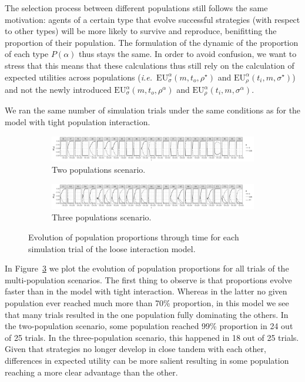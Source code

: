 \documentclass[a4paper]{article}
\begin{document}
The selection process between different populations still follows the same motivation: agents of a certain type that evolve successful strategies (with respect to other types) will be more likely to survive and reproduce, benifitting the proportion of their population.
The formulation of the dynamic of the proportion of each type $P(\alpha)$ thus stays the same.
In order to avoid confusion, we want to stress that this means that these calculations thus still rely on the calculation of expected utilities across populations (\emph{i.e.}~$\text{EU}_{\sigma}^{\alpha}(m,t_{o},\rho^{\star})$ and $\text{EU}_{\rho}^{\alpha}(t_{i},m,\sigma^{\star})$) and not the newly introduced $\text{EU}_{\sigma}^{\alpha}(m,t_{o},\rho^{\alpha})$ and $\text{EU}_{\rho}^{\alpha}(t_{i},m,\sigma^{\alpha})$.

We ran the same number of simulation trials under the same conditions as for the model with tight population interaction.
\begin{figure}
  \centering
  \begin{subfigure}[]{\textwidth}
    \includegraphics[width=\textwidth]{simulation/results/round-3/plots/proportion-cases-0-005-weakest.png}
    \caption{Two populations scenario.}
    \label{fig:proportion-cases-two-loose-interaction}
  \end{subfigure}
  \hfill
  \begin{subfigure}[]{\textwidth}
    \includegraphics[width=\textwidth]{simulation/results/round-3/plots/proportion-cases-0-005-01-weakest.png}
    \caption{Three populations scenario.}
    \label{fig:proportion-cases-three-loose-interaction}
  \end{subfigure}
  \caption{Evolution of population proportions through time for each simulation trial of the loose interaction model.}
  \label{fig:proportion-cases-loose-interaction}
\end{figure}
In Figure~\ref{fig:proportion-cases-loose-interaction} we plot the evolution of population proportions for all trials of the multi-population scenarios.
The first thing to observe is that proportions evolve faster than in the model with tight interaction.
Whereas in the latter no given population ever reached much more than 70\% proportion, in this model we see that many trials resulted in the one population fully dominating the others.
In the two-population scenario, some population reached 99\% proportion in 24 out of 25 trials.
In the three-population scenario, this happened in 18 out of 25 trials.
Given that strategies no longer develop in close tandem with each other, differences in expected utility can be more salient resulting in some population reaching a more clear advantage than the other.
\end{document}
